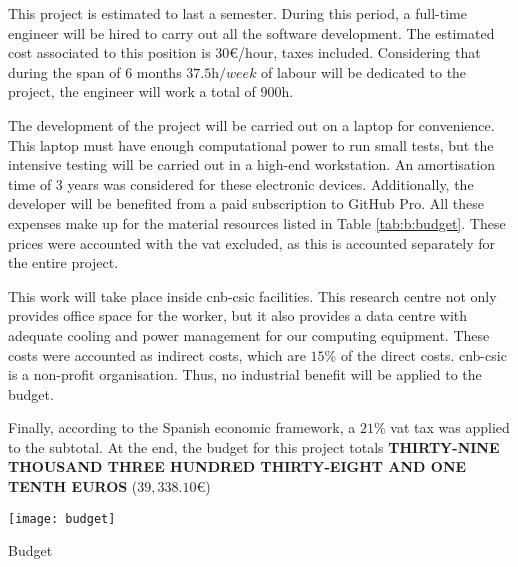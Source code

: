 \documentclass[../main.tex]{subfiles}
\begin{document}
This project is estimated to last a semester. During this period, a full-time engineer will be hired to carry out all the software development. The estimated cost associated to this position is $30$\euro/hour, taxes included. Considering that during the span of 6 months $37.5 \si{\hour/week}$ of labour will be dedicated to the project, the engineer will work a total of $900 \si{\hour}$.

The development of the project will be carried out on a laptop for convenience. This laptop must have enough computational power to run small tests, but the intensive testing will be carried out in a high-end workstation. An amortisation time of 3 years was considered for these electronic devices. Additionally, the developer will be benefited from a paid subscription to GitHub Pro. All these expenses make up for the material resources listed in Table \ref{tab:b:budget}. These prices were accounted with the \gls{vat} excluded, as this is accounted separately for the entire project.

This work will take place inside \gls{cnb}-\gls{csic} facilities. This research centre not only provides office space for the worker, but it also provides a data centre with adequate cooling and power management for our computing equipment. These costs were accounted as indirect costs, which are $15 \si{\percent}$ of the direct costs. \Gls{cnb}-\gls{csic} is a non-profit organisation. Thus, no industrial benefit will be applied to the budget.

Finally, according to the Spanish economic framework, a $21 \si{\percent}$ \gls{vat} tax was applied to the subtotal. At the end, the budget for this project totals \textbf{THIRTY-NINE THOUSAND THREE HUNDRED THIRTY-EIGHT AND ONE TENTH EUROS} ($39,338.10$\euro)

\begin{table}[htbp]
    \centering
    \texttt{[image: budget]}
    \caption{Budget}
    \label{tab:b:budget}
\end{table}
\end{document}
